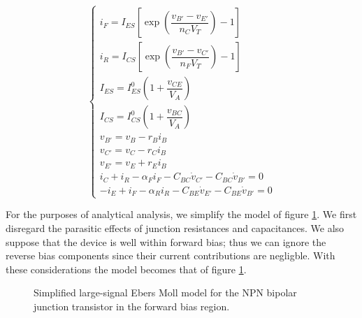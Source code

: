 \begin{equation}
	\left\{\begin{array}{l}
		i_F = I_{ES}\left[\exp\left(\dfrac{v_{B'} - v_{E'}}{n_CV_T}\right) - 1\right] \\[5mm]
		i_R = I_{CS}\left[\exp\left(\dfrac{v_{B'} - v_{C'}}{n_FV_T}\right) - 1\right] \\[5mm]
		I_{ES} = I_{ES}^0 \left(1 + \dfrac{v_{CE}}{V_A}\right) \\[5mm]
		I_{CS} = I_{CS}^0 \left(1 + \dfrac{v_{BC}}{V_A}\right)  \\[5mm] v_{B'} = v_B - r_Bi_B \\[3mm]
		v_{C'} = v_C - r_Ci_B \\[3mm]
		v_{E'} = v_E + r_Ei_B  \\[3mm]
		i_C + i_R - \alpha_F i_F - C_{BC}\dot{v}_{C'} - C_{BC}\dot{v}_{B'} = 0 \\[3mm]
		-i_E + i_F - \alpha_R i_R - C_{BE}\dot{v}_{E'} - C_{BE}\dot{v}_{B'} = 0 
	\end{array}\right. \label{eq:complete_ebers_moll}
\end{equation}

	For the purposes of analytical analysis, we simplify the model of figure \ref{fig:ebers_moll_simplified}. We first disregard the parasitic effects of junction resistances and capacitances. We also suppose that the device is well within forward bias; thus we can ignore the reverse bias components since their current contributions are negligble. With these considerations the model becomes that of figure \ref{fig:ebers_moll_simplified}.

\begin{figure}[h]
\centering
	\caption{Simplified large-signal Ebers Moll model for the NPN bipolar junction transistor in the forward bias region.}
	\label{fig:ebers_moll_simplified}
\end{figure} %

